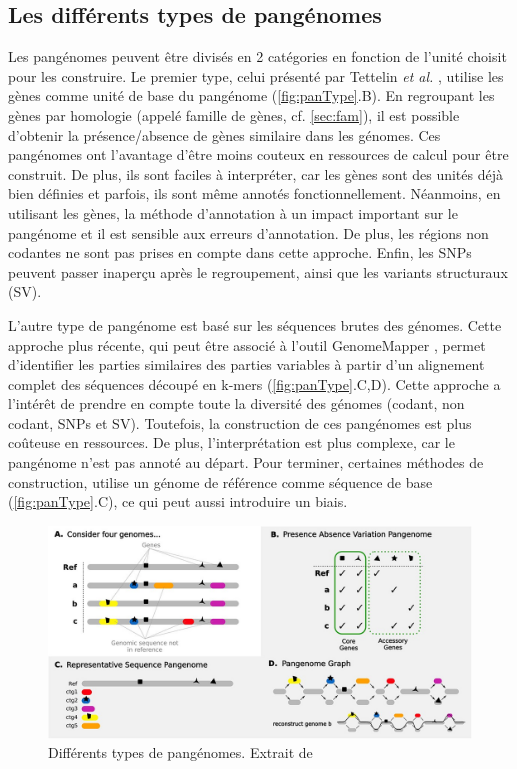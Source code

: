\subsection{Les différents types de pangénomes}

Les pangénomes peuvent être divisés en 2 catégories en fonction de l'unité choisit pour les construire. Le premier type, celui présenté par Tettelin \textit{et al.} \cite{tettelin_genome_2005}, utilise les gènes comme unité de base du pangénome (\autoref{fig:panType}.B). En regroupant les gènes par homologie (appelé famille de gènes, cf. \autoref{sec:fam}), il est possible d'obtenir la présence/absence de gènes similaire dans les génomes. Ces pangénomes ont l'avantage d'être moins couteux en ressources de calcul pour être construit. De plus, ils sont faciles à interpréter, car les gènes sont des unités déjà bien définies et parfois, ils sont même annotés fonctionnellement. Néanmoins, en utilisant les gènes, la méthode d'annotation à un impact important sur le pangénome et il est sensible aux erreurs d'annotation. De plus, les régions non codantes ne sont pas prises en compte dans cette approche. Enfin, les SNPs peuvent passer inaperçu après le regroupement, ainsi que les variants structuraux (SV).

L'autre type de pangénome est basé sur les séquences brutes des génomes. Cette approche plus récente, qui peut être associé à l'outil GenomeMapper \cite{schneeberger_simultaneous_2009}, permet d'identifier les parties similaires des parties variables à partir d'un alignement complet des séquences découpé en k-mers (\autoref{fig:panType}.C,D). Cette approche a l'intérêt de prendre en compte toute la diversité des génomes (codant, non codant, SNPs et SV). Toutefois, la construction de ces pangénomes est plus coûteuse en ressources. De plus, l'interprétation est plus complexe, car le pangénome n'est pas annoté au départ. Pour terminer, certaines méthodes de construction, utilise un génome de référence comme séquence de base (\autoref{fig:panType}.C), ce qui peut aussi introduire un biais.

\begin{figure}[htbp]
    \centering
    \includegraphics[width=0.8\linewidth]{images/pangenomeTypes.jpeg}
    \caption[Différents types de pangénomes]{Différents types de pangénomes. Extrait de \cite{matthews_gentle_2024}}
    \label{fig:panType}
\end{figure}
